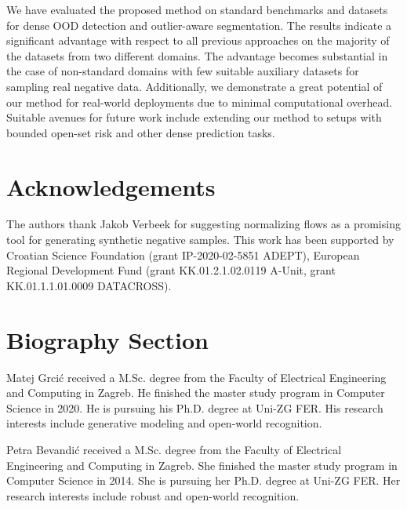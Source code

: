 \documentclass[lettersize,journal,hidelinks]{IEEEtran}
\begin{document}
We have evaluated the proposed method on standard benchmarks and datasets for dense OOD detection and outlier-aware segmentation.
The results indicate a significant advantage with respect to all previous approaches on the majority of the datasets from two different domains.
The advantage becomes substantial 
in the case of non-standard domains
with few suitable auxiliary datasets
for sampling real negative data.
Additionally, we demonstrate a great potential of our method for real-world deployments due to minimal computational overhead.
Suitable avenues for future work include 
extending our method to setups with bounded open-set risk and other dense prediction tasks.

\newpage
\section*{Acknowledgements}
The authors thank Jakob Verbeek for suggesting normalizing flows as a promising tool for generating synthetic negative samples. This work has been supported by Croatian Science Foundation (grant IP-2020-02-5851 ADEPT), European Regional Development Fund (grant KK.01.2.1.02.0119 A-Unit, grant KK.01.1.1.01.0009 DATACROSS).





\section{Biography Section}










\begin{IEEEbiographynophoto}{Matej Grcić} received a M.Sc. degree from the Faculty of Electrical Engineering and Computing in Zagreb. He finished the master study program in
Computer Science in 2020. He is pursuing his Ph.D. degree at Uni-ZG FER.
His research interests include generative modeling and open-world recognition.
\end{IEEEbiographynophoto}
\begin{IEEEbiographynophoto}{Petra Bevandić} received a M.Sc. degree from the Faculty of Electrical Engineering and Computing in Zagreb. She finished the master study
program in Computer Science in 2014. She is pursuing her Ph.D. degree at
Uni-ZG FER. Her research interests include robust and open-world recognition.
\end{IEEEbiographynophoto}
\end{document}
